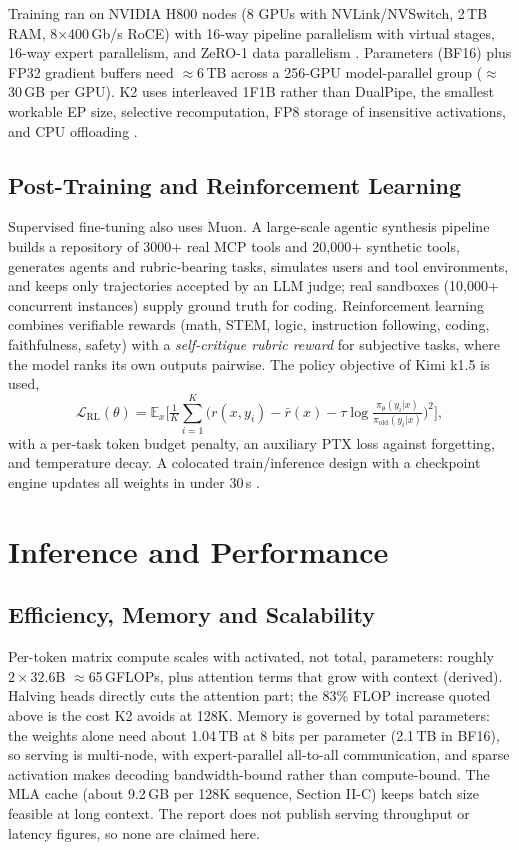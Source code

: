 \documentclass[10pt,twocolumn,letterpaper]{article}
\begin{document}
Training ran on NVIDIA H800 nodes (8 GPUs with NVLink/NVSwitch, 2\,TB RAM, 8$\times$400\,Gb/s RoCE) with 16-way pipeline parallelism with virtual stages, 16-way expert parallelism, and ZeRO-1 data parallelism \cite{zero,megatron}. Parameters (BF16) plus FP32 gradient buffers need $\approx$6\,TB across a 256-GPU model-parallel group ($\approx$30\,GB per GPU). K2 uses interleaved 1F1B rather than DualPipe, the smallest workable EP size, selective recomputation, FP8 storage of insensitive activations, and CPU offloading \cite{kimik2}.

\subsection{Post-Training and Reinforcement Learning}
Supervised fine-tuning also uses Muon. A large-scale agentic synthesis pipeline builds a repository of 3000+ real MCP tools and 20{,}000+ synthetic tools, generates agents and rubric-bearing tasks, simulates users and tool environments, and keeps only trajectories accepted by an LLM judge; real sandboxes (10{,}000+ concurrent instances) supply ground truth for coding. Reinforcement learning combines verifiable rewards (math, STEM, logic, instruction following, coding, faithfulness, safety) with a \emph{self-critique rubric reward} for subjective tasks, where the model ranks its own outputs pairwise. The policy objective of Kimi k1.5 \cite{k15} is used,
\begin{equation}
\mathcal{L}_{\mathrm{RL}}(\theta)=\mathbb{E}_{x}\Big[\tfrac1K\textstyle\sum_{i=1}^{K}\Big(r(x,y_i)-\bar r(x)-\tau\log\tfrac{\pi_\theta(y_i|x)}{\pi_{\mathrm{old}}(y_i|x)}\Big)^{2}\Big],
\end{equation}
with a per-task token budget penalty, an auxiliary PTX loss against forgetting, and temperature decay. A colocated train/inference design with a checkpoint engine updates all weights in under 30\,s \cite{kimik2}.

\section{Inference and Performance}
\subsection{Efficiency, Memory and Scalability}
Per-token matrix compute scales with activated, not total, parameters: roughly $2\times32.6$B $\approx$65\,GFLOPs, plus attention terms that grow with context (derived). Halving heads directly cuts the attention part; the 83\% FLOP increase quoted above is the cost K2 avoids at 128K. Memory is governed by total parameters: the weights alone need about 1.04\,TB at 8 bits per parameter (2.1\,TB in BF16), so serving is multi-node, with expert-parallel all-to-all communication, and sparse activation makes decoding bandwidth-bound rather than compute-bound. The MLA cache (about 9.2\,GB per 128K sequence, Section II-C) keeps batch size feasible at long context. The report does not publish serving throughput or latency figures, so none are claimed here.
\end{document}
